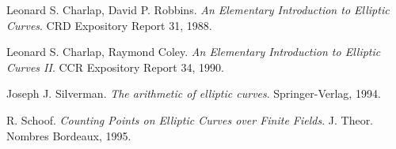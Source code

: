 \begin{thebibliography}{99}

    Leonard S. Charlap, David P. Robbins.
    \emph{An Elementary Introduction to Elliptic Curves}.
    CRD Expository Report 31, 1988.

    Leonard S. Charlap, Raymond Coley.
    \emph{An Elementary Introduction to Elliptic Curves II}.
    CCR Expository Report 34, 1990.

    Joseph J. Silverman.
    \emph{The arithmetic of elliptic curves}.
    Springer-Verlag, 1994.

    R. Schoof.
    \emph{Counting Points on Elliptic Curves over Finite Fields}.
    J. Theor. Nombres Bordeaux, 1995.

\end{thebibliography}
